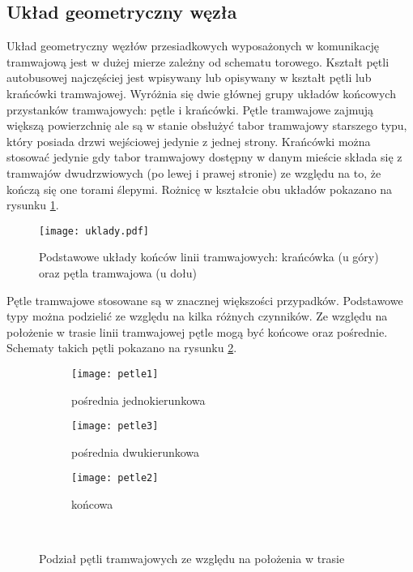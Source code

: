 \documentclass[twoside,12pt]{article}
\begin{document}
	\clearpage
	\subsection{Układ geometryczny węzła}
	
	Układ geometryczny węzłów przesiadkowych wyposażonych w komunikację tramwajową jest w dużej mierze zależny od schematu torowego. Kształt pętli autobusowej najczęściej jest wpisywany lub opisywany w kształt pętli lub krańcówki tramwajowej. Wyróżnia się dwie głównej grupy układów końcowych przystanków tramwajowych: pętle i krańcówki. Pętle tramwajowe zajmują większą powierzchnię ale są w stanie obsłużyć tabor tramwajowy starszego typu, który posiada drzwi wejściowej jedynie z jednej strony. Krańcówki można stosować jedynie gdy tabor tramwajowy dostępny w danym mieście składa się z tramwajów dwudrzwiowych (po lewej i prawej stronie) ze względu na to, że kończą się one torami ślepymi. Rożnicę w kształcie obu układów pokazano na rysunku \ref{uklady}.
	
	\begin{figure}[H]
		\centering
		\texttt{[image: uklady.pdf]}\\
		\label{uklady}
		\caption{Podstawowe układy końców linii tramwajowych: krańcówka (u góry) oraz pętla tramwajowa (u dołu)}		
	\end{figure}
	
	Pętle tramwajowe stosowane są w znacznej większości przypadków. Podstawowe typy można podzielić ze względu na kilka różnych czynników. Ze względu na położenie w trasie linii tramwajowej pętle mogą być końcowe oraz pośrednie. Schematy takich pętli pokazano na rysunku \ref{petle1}.
	
	\begin{figure}[H]
	\centering
	\begin{subfigure}{.33\textwidth}
	  \centering
	  \texttt{[image: petle1]}
	  \caption{pośrednia jednokierunkowa}
	\end{subfigure}%
	\begin{subfigure}{.33\textwidth}
	  \centering
	  \texttt{[image: petle3]}
	  \caption{pośrednia dwukierunkowa}
	\end{subfigure}%
	\begin{subfigure}{.33\textwidth}
	  \centering
	  \texttt{[image: petle2]}
	  \caption{końcowa}
	\end{subfigure}
	\label{petle1}\\
	\caption{Podział pętli tramwajowych ze względu na położenia w trasie}
	\end{figure}
\end{document}
